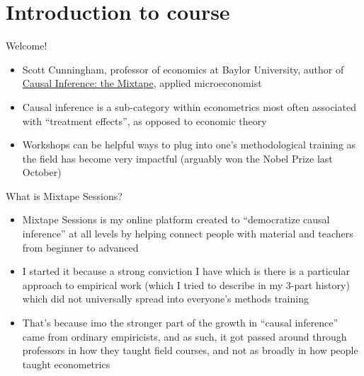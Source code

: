 \documentclass{beamer}
\begin{document}




\section{Introduction to course}


\begin{frame}{Welcome!}

  \begin{itemize}
	\item Scott Cunningham, professor of economics at Baylor University, author of \underline{Causal Inference: the Mixtape}, applied microeconomist 
	\item Causal inference is a sub-category within econometrics most often associated with ``treatment effects'', as opposed to economic theory
	\item Workshops can be helpful ways to plug into one's methodological training as the field has become very impactful (arguably won the Nobel Prize last October)
  \end{itemize}

\end{frame}


\begin{frame}{What is Mixtape Sessions?}

  \begin{itemize}
    \item Mixtape Sessions is my online platform created to ``democratize causal inference'' at all levels by helping connect people with material and teachers from beginner to advanced
    \item I started it because a strong conviction I have which is there is a particular approach to empirical work (which I tried to describe in my 3-part history) which did not universally spread into everyone's methods training
    \item That's because imo the stronger part of the growth in ``causal inference'' came from ordinary empiricists, and as such, it got passed around through professors in how they taught field courses, and not as broadly in how people taught econometrics
  \end{itemize}

\end{frame}
\end{document}
